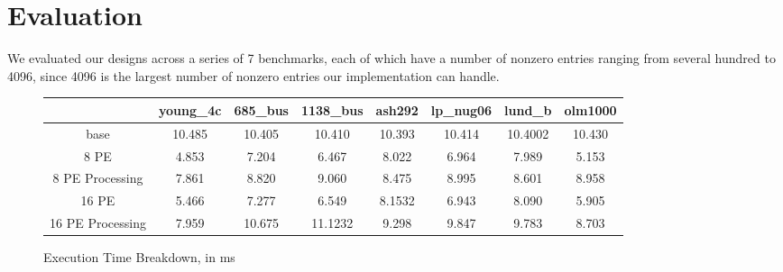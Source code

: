 \documentclass[10pt]{article}
\begin{document}
\section{Evaluation}

\noindent We evaluated our designs across a series of 7 benchmarks, each of which have a number of nonzero entries ranging
from several hundred to 4096, since 4096 is the largest number of nonzero entries our implementation can handle. \newline

\begin{figure}[h!]
  \centering
  \begin{tabular} {| c | c | c | c | c | c | c | c |}
    \hline
                    & young\_4c & 685\_bus & 1138\_bus & ash292 & lp\_nug06 & lund\_b & olm1000 \\
    \hline
    base            & 10.485    & 10.405   & 10.410    & 10.393 & 10.414    & 10.4002 & 10.430 \\
    \hline
    8 PE            & 4.853     & 7.204    & 6.467     & 8.022  & 6.964     & 7.989   & 5.153 \\
    \hline
    8 PE Processing & 7.861     & 8.820    & 9.060     & 8.475  & 8.995     & 8.601   & 8.958 \\
    \hline
    16 PE           & 5.466     & 7.277    & 6.549     & 8.1532 & 6.943     & 8.090   & 5.905 \\
    \hline
    16 PE Processing& 7.959     & 10.675   &   11.1232 & 9.298  & 9.847     & 9.783   & 8.703 \\
    \hline
  \end{tabular}
  \caption{Execution Time Breakdown, in ms}
  \label{fig:exec_times}
\end{figure}
\end{document}
